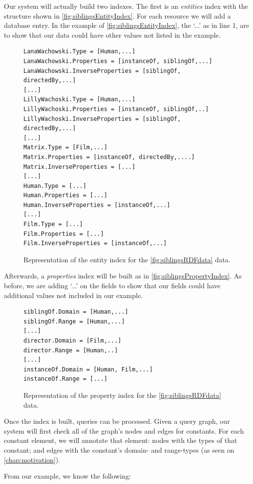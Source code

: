 Our system will actually build two indexes. The first is an \textit{entities} index with the structure shown in \autoref{fig:siblingsEntityIndex}. For each resource we will add a database entry. In the example of \autoref{fig:siblingsEntityIndex}, the `...' as in line 1, are to show that our data could have other values not listed in the example. 
\begin{figure}[H]
\begin{verbatim}
LanaWachowski.Type = [Human,...]
LanaWachowski.Properties = [instanceOf, siblingOf,...]
LanaWachowski.InverseProperties = [siblingOf, directedBy,...]
[...]
LillyWachoski.Type = [Human,...]
LillyWachoski.Properties = [instanceOf, siblingOf,..]
LillyWachoski.InverseProperties = [siblingOf, directedBy,...]
[...]
Matrix.Type = [Film,...]
Matrix.Properties = [instanceOf, directedBy,....]
Matrix.InverseProperties = [...]
[...]
Human.Type = [...]
Human.Properties = [...]
Human.InverseProperties = [instanceOf,...]
[...]
Film.Type = [...]
Film.Properties = [...]
Film.InverseProperties = [instanceOf,...]
\end{verbatim}
\caption{Representation of the entity index for the \autoref{fig:siblingsRDFdata} data.}
\label{fig:siblingsEntityIndex}
\end{figure}

Afterwards, a \textit{properties} index will be built as in \autoref{fig:siblingsPropertyIndex}. As before, we are adding `...' on the fields to show that our fields could have additional values not included in our example.
\begin{figure}[H]
\begin{verbatim}
siblingOf.Domain = [Human,...]
siblingOf.Range = [Human,...]
[...]
director.Domain = [Film,...]
director.Range = [Human,..]
[...]
instanceOf.Domain = [Human, Film,...]
instanceOf.Range = [...]
\end{verbatim}
\caption{Representation of the property index for the \autoref{fig:siblingsRDFdata} data.}
\label{fig:siblingsPropertyIndex}
\end{figure}

Once the index is built, queries can be processed. Given a query graph, our system will first check all of the graph's nodes and edges for constants. For each constant element, we will annotate that element: nodes with the types of that constant; and edges with the constant's domain- and range-types (as seen on \autoref{chap:motivation}). 

From our example, we know the following:

